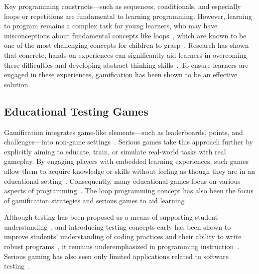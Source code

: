 

Key programming constructs—such as sequences, conditionals, and
especially loops or repetitions are fundamental to learning
programming. However, learning to program remains a complex task for
young learners, who may have misconceptions about fundamental concepts
like loops~\cite{qian2017students,sorva2012visual}, which are known to
be one of the most challenging concepts for children to
grasp~\cite{DBLP:journals/ijcci/GomesFT18,DBLP:conf/sigcse/GroverB17}. Research
has shown that concrete, hands-on experiences can significantly aid
learners in overcoming these difficulties and developing abstract
thinking
skills~\cite{DBLP:journals/ijcci/GomesFT18,DBLP:conf/sigcse/GroverB17,DBLP:journals/eait/MladenovicBZ18}. To
ensure learners are engaged in these experiences, gamification has
been shown to be an effective solution.


\subsection{Educational  Testing Games}

Gamification integrates game-like elements—such as leaderboards,
points, and challenges—into non-game
settings~\cite{DBLP:conf/mindtrek/DeterdingDKN11}.
Serious games take this approach further by explicitly aiming to
educate, train, or simulate real-world tasks with real gameplay. By engaging players
with embedded learning experiences, such games allow them to acquire
knowledge or skills without feeling as though they are in an
educational setting~\cite{DBLP:conf/chi/RaybournB05}. Consequently,
many educational games focus on various aspects of
programming~\cite{DBLP:journals/bjet/LindbergLH19,DBLP:journals/ijcci/MacridesMA22,DBLP:journals/ijcci/GomesFT18}. The
loop programming concept has also been the focus of gamification
strategies and serious games to aid
learning~\cite{shorn2018teaching,DBLP:conf/dac/BoroujerdianGCP21,zhao2019improving,makri2019computer}.

Although testing has been proposed as a means of supporting student
understanding~\cite{denny2019closer,prather2018metacognitive,wrenn2019executable,prasad2023conceptual},
and introducing testing concepts early has been shown to improve
students' understanding of coding practices and their ability to write
robust programs~\cite{DBLP:conf/acse/Carrington97,
	jones2001experiential,DBLP:conf/iticse/MarreroS05}, it remains
underemphasized in programming
instruction~\cite{DBLP:journals/jss/GarousiRLA20}. Serious gaming has
also seen only limited applications related to software
testing~\cite{DBLP:conf/icer/MiljanovicB17,
	DBLP:conf/icse/PrasetyaLMTBEKM19, DBLP:conf/fie/ToledoLS22}.


